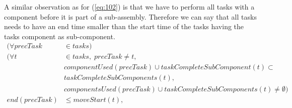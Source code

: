   \noindent A similar observation as for (\ref{eq:102}) is that we have to perform all tasks with a component before it is part of a sub-assembly. Therefore we can say that all tasks needs to have an end time smaller than the start time of the tasks having the tasks component as sub-component.
 \begin{equation}
 \begin{aligned}\label{eq:103}
 (\forall precTask &\in tasks) \\
 (\forall t &\in tasks, \; precTask \neq t,\\
 &componentUsed(precTask) \cup taskCompleteSubComponent(t) \subset\\
 &taskCompleteSubComponents(t),\\
 &componentsUsed(precTask) \cup taskCompleteSubComponents(t) \neq \emptyset)\\
 end(precTask) &\leq moveStart(t), \\
 \end{aligned}
 \end{equation}

